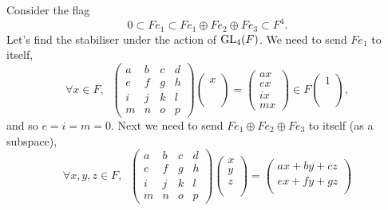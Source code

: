     \begin{example}
        Consider the flag
        \[0 \subset Fe_1 \subset Fe_1\oplus Fe_2 \oplus Fe_3 \subset F^4.\]
        Let's find the stabiliser under the action of \(\operatorname{GL}_4(F)\). We need to send \(Fe_1\) to itself,
        \[\forall x\in F, \;\; \begin{pmatrix}
            a & b&c &d\\
            e&f&g &h \\
            i&j&k&l \\
            m&n&o&p
        \end{pmatrix}\begin{pmatrix}
            x \\
            \\
            \\
            \\
        \end{pmatrix} = \begin{pmatrix}
            ax\\
            ex\\
            ix\\
            mx 
        \end{pmatrix} \in F\begin{pmatrix}
            1 \\
            \\
            \\
            \\
        \end{pmatrix}, \]
        and so \(e = i = m = 0\). Next we need to send \(Fe_1\oplus Fe_2 \oplus Fe_3\) to itself (as a subspace),
        \[\forall x,y,z\in F, \;\;\begin{pmatrix}
            a & b&c &d\\
            e&f&g &h \\
            i&j&k&l \\
            m&n&o&p
        \end{pmatrix}\begin{pmatrix}
            x \\
            y\\
            z\\
            \\
        \end{pmatrix} = \begin{pmatrix}
            ax+by+cz\\
            ex+fy+gz\\

\end{pmatrix}\]
\end{example}

